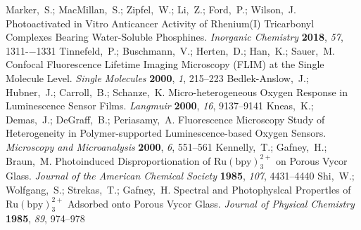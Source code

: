 \documentclass[aps,prl,twocolumn,superscriptaddress,groupedaddress]{revtex4}
\begin{document}
\begin{mcitethebibliography}{88}
\EndOfBibitem
{}
Marker,~S.; MacMillan,~S.; Zipfel,~W.; Li,~Z.; Ford,~P.; Wilson,~J.
  Photoactivated in Vitro Anticancer Activity of Rhenium(I) Tricarbonyl
  Complexes Bearing Water-Soluble Phosphines. \emph{Inorganic Chemistry}
  \textbf{2018}, \emph{57}, 1311-−1331 \relax
\mciteBstWouldAddEndPunctfalse
\mciteSetBstMidEndSepPunct{\mcitedefaultmidpunct}
{}{\mcitedefaultseppunct}\relax
\EndOfBibitem
{}
Tinnefeld,~P.; Buschmann,~V.; Herten,~D.; Han,~K.; Sauer,~M. Confocal
  Fluorescence Lifetime Imaging Microscopy (FLIM) at the Single Molecule Level.
  \emph{Single Molecules} \textbf{2000}, \emph{1}, 215--223\relax
\mciteBstWouldAddEndPuncttrue
\mciteSetBstMidEndSepPunct{\mcitedefaultmidpunct}
{\mcitedefaultendpunct}{\mcitedefaultseppunct}\relax
\EndOfBibitem
{}
Bedlek-Anslow,~J.; Hubner,~J.; Carroll,~B.; Schanze,~K. Micro-heterogeneous
  Oxygen Response in Luminescence Sensor Films. \emph{Langmuir} \textbf{2000},
  \emph{16}, 9137--9141\relax
\mciteBstWouldAddEndPuncttrue
\mciteSetBstMidEndSepPunct{\mcitedefaultmidpunct}
{\mcitedefaultendpunct}{\mcitedefaultseppunct}\relax
\EndOfBibitem
{}
Kneas,~K.; Demas,~J.; DeGraff,~B.; Periasamy,~A. Fluorescence Microscopy Study
  of Heterogeneity in Polymer-supported Luminescence-based Oxygen Sensors.
  \emph{Microscopy and Microanalysis} \textbf{2000}, \emph{6}, 551--561\relax
\mciteBstWouldAddEndPuncttrue
\mciteSetBstMidEndSepPunct{\mcitedefaultmidpunct}
{\mcitedefaultendpunct}{\mcitedefaultseppunct}\relax
\EndOfBibitem
{}
Kennelly,~T.; Gafney,~H.; Braun,~M. Photoinduced Disproportionation of
  $\mathrm{Ru(bpy)_3^{2+}}$ on Porous Vycor Glass. \emph{Journal of the
  American Chemical Society} \textbf{1985}, \emph{107}, 4431--4440\relax
\mciteBstWouldAddEndPuncttrue
\mciteSetBstMidEndSepPunct{\mcitedefaultmidpunct}
{\mcitedefaultendpunct}{\mcitedefaultseppunct}\relax
\EndOfBibitem
{}
Shi,~W.; Wolfgang,~S.; Strekas,~T.; Gafney,~H. Spectral and Photophyslcal
  Propertles of $\mathrm{Ru(bpy)_3^{2+}}$ Adsorbed onto Porous Vycor Glass.
  \emph{Journal of Physical Chemistry} \textbf{1985}, \emph{89}, 974--978\relax

\end{mcitethebibliography}
\end{document}
